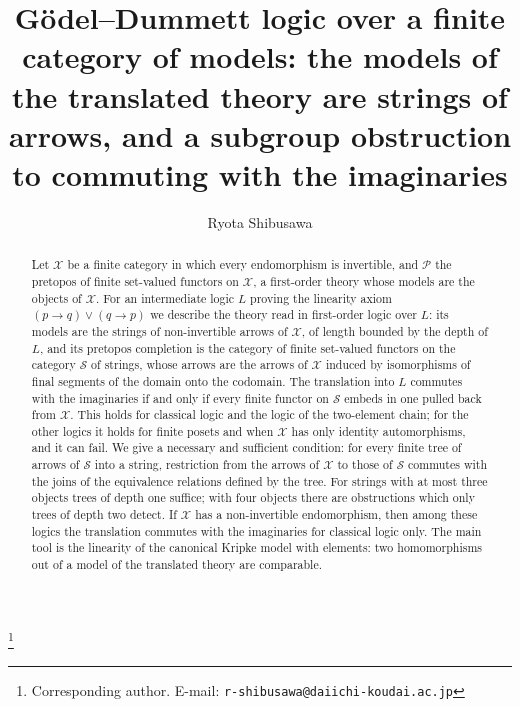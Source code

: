 \documentclass[11pt]{amsart}
\theoremstyle{definition}
\newcommand{\cX}{\mathcal X}
\newcommand{\cP}{\mathcal P}
\newcommand{\cS}{\mathcal S}
\begin{document}
\title[G\"odel--Dummett logic over finite categories of models]{G\"odel--Dummett
logic over a finite category of models: the models of the translated
theory are strings of arrows, and a subgroup obstruction to commuting with the imaginaries}
\author{Ryota Shibusawa}
\thanks{Corresponding author. E-mail: \texttt{r-shibusawa@daiichi-koudai.ac.jp}}
\address{Daiichi Institute of Technology}

\begin{abstract}
Let $\cX$ be a finite category in which every endomorphism is
invertible, and $\cP$ the pretopos of finite set-valued functors on
$\cX$, a first-order theory whose models are the objects of $\cX$. For
an intermediate logic $L$ proving the linearity axiom $(p\to q)\vee
(q\to p)$ we describe the theory read in first-order logic over $L$:
its models are the strings of non-invertible arrows of $\cX$, of length
bounded by the depth of $L$, and its pretopos completion is the
category of finite set-valued functors on the category $\cS$ of
strings, whose arrows are the arrows of $\cX$ induced by isomorphisms
of final segments of the domain onto the codomain. The translation
into $L$ commutes with the imaginaries if and only if every finite
functor on $\cS$ embeds in one pulled back from $\cX$. This holds for
classical logic and the logic of the two-element chain; for the other
logics it holds for finite posets and when $\cX$ has only identity
automorphisms, and it can fail. We give a necessary and sufficient
condition: for every finite tree of arrows of $\cS$ into a string,
restriction from the arrows of $\cX$ to those of $\cS$ commutes with
the joins of the equivalence relations defined by the tree. For
strings with at most three objects trees of depth one suffice; with
four objects there are obstructions which only trees of depth two
detect. If $\cX$ has a non-invertible endomorphism, then among these
logics the translation commutes with the imaginaries for classical
logic only. The main tool is the linearity of
the canonical Kripke model with elements: two homomorphisms out of a
model of the translated theory are comparable.
\end{abstract}

\maketitle
\end{document}
